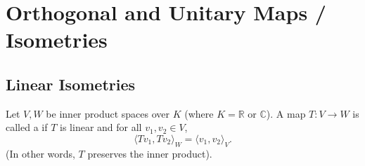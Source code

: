 \renewcommand{\thetheorem}{25.a.\arabic{theorem}}
\setcounter{theorem}{0}
\setcounter{chapter}{24}

\chapter{Orthogonal and Unitary Maps / Isometries}

\section{Linear Isometries}

\begin{definition}
\label{def:linear_isometry}
Let $V, W$ be inner product spaces over $K$ (where $K = \mathbb{R}$ or $\mathbb{C}$). A map $T \colon V \to W$ is called a  if $T$ is linear and for all $v_1, v_2 \in V$, 
\[ \langle Tv_1, Tv_2 \rangle_W = \langle v_1, v_2 \rangle_V. \]
(In other words, $T$ preserves the inner product).
\end{definition}

